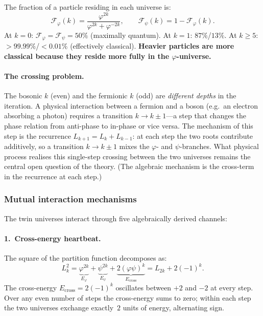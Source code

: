 \documentclass[12pt,a4paper]{article}
\begin{document}
\noindent The fraction of a particle residing in each universe is:
\begin{equation}
\label{eq:phi-fraction}
\mathcal{F}_\varphi(k) = \frac{\varphi^{2k}}{\varphi^{2k} + \varphi^{-2k}}, \qquad
\mathcal{F}_\psi(k) = 1 - \mathcal{F}_\varphi(k).
\end{equation}
At $k = 0$: $\mathcal{F}_\varphi = \mathcal{F}_\psi = 50\%$ (maximally quantum). At $k = 1$: $87\%$/$13\%$. At $k \geq 5$: $> 99.99\%$/$< 0.01\%$ (effectively classical). \textbf{Heavier particles are more classical because they reside more fully in the $\varphi$-universe.}

\paragraph{The crossing problem.}
The bosonic $k$ (even) and the fermionic $k$ (odd) are \emph{different depths} in the iteration. A physical interaction between a fermion and a boson (e.g.\ an electron absorbing a photon) requires a transition $k \to k \pm 1$---a step that changes the phase relation from anti-phase to in-phase or vice versa. The mechanism of this step is the recurrence $L_{k+1} = L_k + L_{k-1}$: at each step the two roots contribute additively, so a transition $k \to k \pm 1$ mixes the $\varphi$- and $\psi$-branches. What physical process realises this single-step crossing between the two universes remains the central open question of the theory. (The algebraic mechanism is the cross-term in the recurrence at each step.)

\subsubsection{Mutual interaction mechanisms}

The twin universes interact through five algebraically derived channels:

\paragraph{1.\ Cross-energy heartbeat.}
The square of the partition function decomposes as:
\begin{equation}
L_k^2 = \underbrace{\varphi^{2k}}_{E_\varphi} + \underbrace{\psi^{2k}}_{E_\psi} + \underbrace{2(\varphi\psi)^k}_{E_{\mathrm{cross}}} = L_{2k} + 2(-1)^k.
\end{equation}
The cross-energy $E_{\mathrm{cross}} = 2(-1)^k$ oscillates between $+2$ and $-2$ at every step. Over any even number of steps the cross-energy sums to zero; within each step the two universes exchange exactly~$2$ units of energy, alternating sign.
\end{document}
